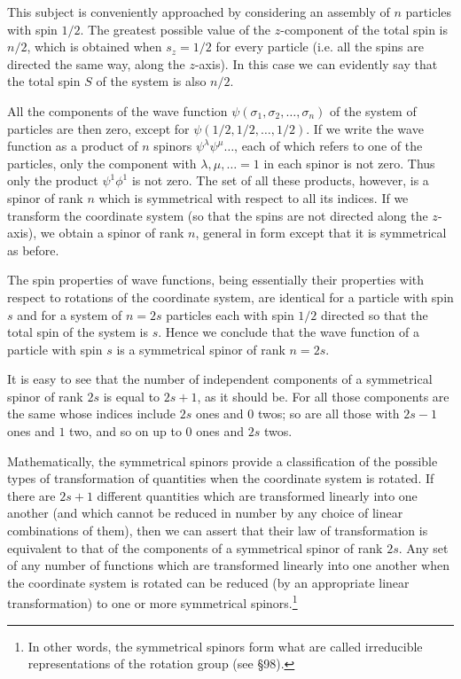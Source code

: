 This subject is conveniently approached by considering an assembly of $ n $ particles with spin $ 1/2 $. The greatest possible value of the $ z $-component of the total spin is $ n/2 $, which is obtained when $ s_z = 1/2 $ for every particle (i.e. all the spins are directed the same way, along the $ z $-axis). In this case we can evidently say that the total spin $ S $ of the system is also $ n/2 $.

All the components of the wave function $ \psi(\sigma_1, \sigma_2, \dots, \sigma_n) $ of the system of particles are then zero, except for $ \psi(1/2, 1/2, \dots,1/2) $. If we write the wave function as a product of $ n $ spinors $ \psi^\lambda\psi^\mu\dots $, each of which refers to one of the particles, only the component with $ \lambda, \mu,\dots = 1 $ in each spinor is not zero. Thus only the product $ \psi^1\phi^1 $ is not zero. The set of all these products, however, is a spinor of rank $ n $ which is symmetrical with respect to all its indices. If we transform the coordinate system (so that the spins are not directed along the $ z $-axis), we obtain a spinor of rank $ n $, general in form except that it is symmetrical as before.

The spin properties of wave functions, being essentially their properties with respect to rotations of the coordinate system, are identical for a particle with spin $ s $ and for a system of $ n = 2s $ particles each with spin $ 1/2 $ directed so that the total spin of the system is $ s $. Hence we conclude that the wave function of a particle with spin $ s $ is a symmetrical spinor of rank $ n = 2s $.

It is easy to see that the number of independent components of a symmetrical spinor of rank $ 2s $ is equal to $ 2s + 1 $, as it should be. For all those components are the same whose indices include $ 2s $ ones and $ 0 $ twos; so are all those with $ 2s−1 $ ones and $ 1 $ two, and so on up to $ 0 $ ones and $ 2s $ twos.

Mathematically, the symmetrical spinors provide a classification of the possible types of transformation of quantities when the coordinate system is rotated. If there are $ 2s + 1 $ different quantities which are transformed linearly into one another (and which cannot be reduced in number by any choice of linear combinations of them), then we can assert that their law of transformation is equivalent to that of the components of a symmetrical spinor of rank $ 2s $. Any set of any number of functions which are transformed linearly into one another when the coordinate system is rotated can be reduced (by an appropriate linear transformation) to one or more symmetrical spinors.\footnote{In other words, the symmetrical spinors form what are called irreducible representations of the rotation group (see \S98).
}

